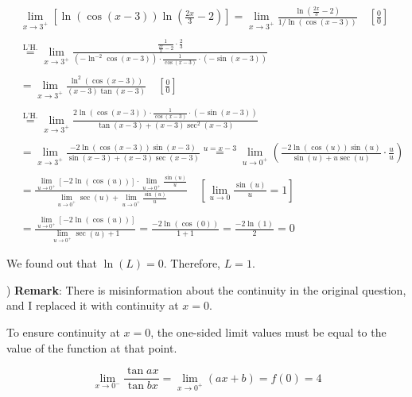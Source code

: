 \documentclass{article}
\begin{document}
\begin{align*}&\lim_{x\to3^+}\left[ \ln\left(\cos(x-3)\right)\ln\left(\frac{2x}{3}-2\right)\right] = \lim_{x\to3^+}\frac{\ln\left(\frac{2x}{3}-2\right)}{1/ \ln\left(\cos(x-3)\right)} \quad \left[\frac00\right] \\\\&\overset{\text{L'H.}}{=} \lim_{x\to3^+}\frac{\displaystyle\frac1{\frac{2x}{3} - 2}\cdot \frac{2}{3}}{\displaystyle \left(-\ln^{-2}\displaystyle \cos(x-3)\right)\cdot \frac{1}{\cos(x-3)}\cdot(-\sin(x-3))}\\\\&= \lim_{x\to3^+} \displaystyle\frac{\ln^2(\cos(x-3))}{(x-3)\tan(x-3)} \quad\left[\frac00\right]\\\\&\overset{\text{L'H.}}{=} \lim_{x\to3^+} \frac{\displaystyle2\ln(\cos(x-3))\cdot\frac{1}{\cos(x-3)}\cdot(-\sin(x-3))}{\tan(x-3) + (x-3)\sec^2(x-3)}\\\\&=\lim_{x\to3^+}\frac{\displaystyle-2\ln(\cos(x-3))\sin(x-3)}{\sin(x-3) + (x-3)\sec(x-3)} \overset{u=x-3}{=} \lim_{u\to0^+}\left(\frac{\displaystyle-2\ln(\cos(u))\sin(u)}{\sin(u) + u\sec(u)} \cdot\frac{u}{u}\right)\\\\& = \frac{\displaystyle\lim_{u\to0^+}[-2\ln(\cos(u))]\cdot \lim_{u\to0^+}\frac{\sin(u)}{u}}{\displaystyle\lim_{u\to0^+}\sec(u)+\lim_{u\to0^+}\frac{\sin(u)}{u}}\quad \left[\lim_{u\to0} \frac{\sin(u)}u=1\right]\\\\&=\frac{\displaystyle\lim_{u\to0^+}[-2\ln(\cos(u))]}{\displaystyle\lim_{u\to0^+}\sec(u)+1}  =\frac{-2\ln(\cos(0))}{1+1} =\frac{-2\ln(1)}{2} = 0\end{align*}

\hfill

\noindent We found out that $\ln(L) = 0$. Therefore, $\boxed{L = 1}$.

\newpage

) \textbf{Remark}: There is misinformation about the continuity in the original question, and I replaced it with continuity at $x=0$.

\hfill

\noindent To ensure continuity at $x=0$, the one-sided limit values must be equal to the value of the function at that point.

\begin{equation*}
\lim_{x\to0^-} \frac{\tan ax}{\tan bx} = \lim_{x\to0^+} (ax+b) = f(0) = 4
\end{equation*}
\end{document}
